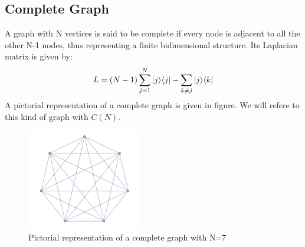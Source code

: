     \subsection{Complete Graph}
        A graph with N vertices is said to be complete if every node is adjacent to all the other N-1 nodes, thus representing a finite bidimensional structure. Its Laplacian matrix is given by:
        \begin{equation}
            L = (N-1)\sum_{j=1}^{N}{|{j}\rangle}{\langle{j}|} - \sum_{k\neq j}{|{j}\rangle}{\langle{k}|}
        \end{equation}
        A pictorial representation of a complete graph is given in figure. We will refere to this kind of graph with $C(N)$.
        \begin{figure}[hb]
          \centering
          \includegraphics[width=50mm]{./figures/chapter1/complete}
          \caption[Pictorial representation of a complete graph]{Pictorial representation of a complete graph with N=7}
        \end{figure}

